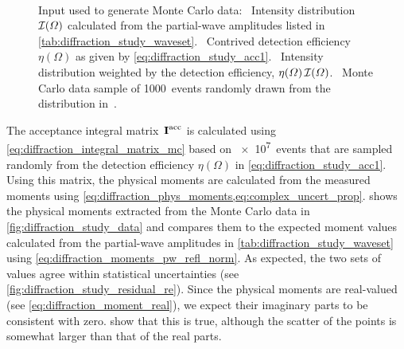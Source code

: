 \begin{figure}[tbp]
  \centering%
  \\%
  \caption{Input used to generate Monte Carlo data:
  ~Intensity
  distribution $\mathcal{I}(\Omega)$ calculated from the partial-wave
  amplitudes listed in \cref{tab:diffraction_study_waveset}.
  ~Contrived detection
  efficiency $\eta(\Omega)$ as given by
  \cref{eq:diffraction_study_acc1}.
  ~Intensity
  distribution weighted by the detection efficiency, \ie
  $\eta(\Omega)\, \mathcal{I}(\Omega)$.
  ~Monte Carlo data sample
  of \num{1000}~events randomly drawn from the distribution
  in~.}%
  \label{fig:diffraction_study_input}%
\end{figure}

The acceptance integral matrix~$\bm{\mathrm{I}}^\text{acc}$ is calculated
using \cref{eq:diffraction_integral_matrix_mc} based on \num{e7}~events
that are sampled randomly from the detection efficiency $\eta(\Omega)$
in \cref{eq:diffraction_study_acc1}.  Using this matrix, the physical
moments are calculated from the measured moments using
\cref{eq:diffraction_phys_moments,eq:complex_uncert_prop}.
 shows the physical moments
extracted from the Monte Carlo data in
\cref{fig:diffraction_study_data} and compares them to the expected
moment values calculated from the partial-wave amplitudes in
\cref{tab:diffraction_study_waveset} using
\cref{eq:diffraction_moments_pw_refl_norm}.  As expected, the two sets
of values  agree within statistical uncertainties (see
\cref{fig:diffraction_study_residual_re}).  Since the physical moments
are real-valued (see \cref{eq:diffraction_moment_real}), we expect
their imaginary parts to be consistent with zero.
show that this is true, although the scatter of the points is somewhat
larger than that of the real parts.

